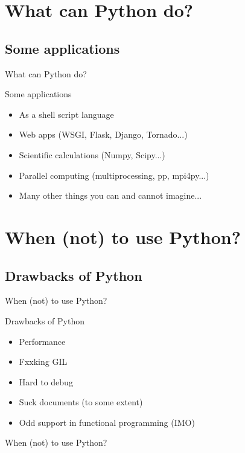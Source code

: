 \documentclass{beamer}
\begin{document}
\section{What can Python do?}
\subsection{Some applications}
\begin{frame}{What can Python do?}\pause
\begin{block}{Some applications}
 \begin{itemize}
  \item As a shell script language\pause
  \item Web apps (WSGI, Flask, Django, Tornado...)\pause
  \item Scientific calculations (Numpy, Scipy...)\pause
  \item Parallel computing (multiprocessing, pp, mpi4py...)\pause
  \item Many other things you can and cannot imagine...
 \end{itemize}
\end{block}
\end{frame}

\section{When (not) to use Python?}
\subsection{Drawbacks of Python}
\begin{frame}{When (not) to use Python?}\pause
 \begin{block}{Drawbacks of Python}
  \begin{itemize}
   \item Performance\pause
   \item Fxxking GIL\pause
   \item Hard to debug\pause
   \item Suck documents (to some extent)\pause
   \item Odd support in functional programming (IMO)\pause
  \end{itemize}
 \end{block}
 
 \begin{block}{When (not) to use Python?}
 \end{block}
\end{frame}
\end{document}
